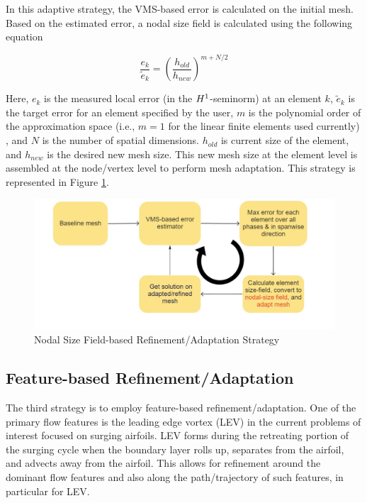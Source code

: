 In this adaptive strategy, the VMS-based error is calculated on the initial mesh. Based on the estimated error, a nodal size field is calculated using the following equation \cite{zhang19}

\begin{equation}
	\frac{e_k}{\tilde{e}_k} = \left(\frac{h_{old}}{h_{new}}\right)^{m+N/2} 
	\label{eq:diez}
\end{equation}

Here, $e_k$ is the measured local error (in the $H^{1}$-seminorm) at an element $k$, $\tilde{e}_k$ is the target error for an element specified by the user, $m$ is the polynomial order of the approximation space (i.e., $m=1$ for the linear finite elements used currently) , and $N$ is the number of spatial dimensions. $h_{old}$ is current size of the element, and $h_{new}$ is the desired new mesh size.
This new mesh size at the element level is assembled at the node/vertex level to perform mesh adaptation.
This strategy is represented in Figure \ref{fig:size_based_strat}.

\begin{figure}[H]
	\centering
	\includegraphics[width=1\textwidth]{figures/adapt_strat/size_based.png}
	\caption{Nodal Size Field-based Refinement/Adaptation Strategy}
	\label{fig:size_based_strat}
\end{figure}

\subsection{Feature-based Refinement/Adaptation}

The third strategy is to employ feature-based refinement/adaptation. 
One of the primary flow features is the leading edge vortex (LEV) in the current problems of interest focused on surging airfoils. LEV forms during the retreating portion of the surging cycle when the boundary layer rolls up, separates from the airfoil, and advects away from the airfoil.
This allows for refinement around the dominant flow features and also along the path/trajectory of such features, in particular for LEV.


